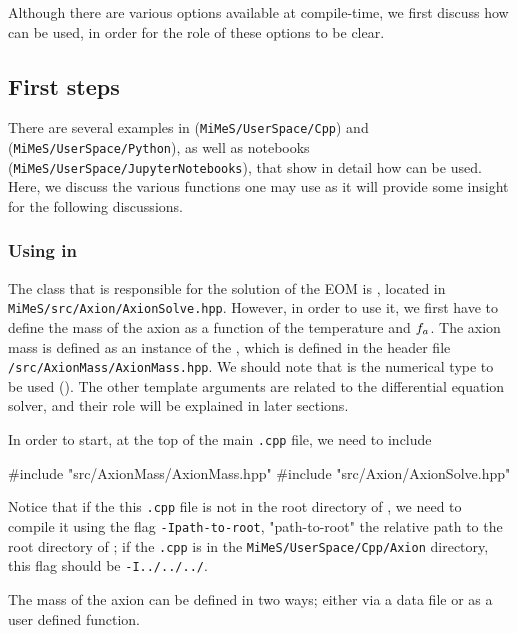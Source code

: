 \documentclass[11pt,a4paper]{article}
\begin{document}
Although there are various options available at compile-time, we first discuss how \mimes can be used, in order for the role of these options to be clear. 


\subsection{First steps}\label{sec:First_examples} 
%
There are several examples in \CPP ({\tt MiMeS/UserSpace/Cpp}) and \PY ({\tt MiMeS/UserSpace/Python}), as well as \JUPY  notebooks ({\tt MiMeS/UserSpace/JupyterNotebooks}), that show in detail how \mimes can be used. Here, we discuss the various functions one may use as it will provide some insight for the following discussions. 

\subsubsection{Using \mimes in \CPP}\label{sec:cpp_first_example}
%
The class that is responsible for the solution of the EOM is , located in {\tt MiMeS/src/Axion/AxionSolve.hpp}. However, in order to use it, we first have to define the mass of the axion as a function of the temperature and $f_{a}{}$. The axion mass is defined as an instance of the , which is defined in the header file {\tt \mimes/src/AxionMass/AxionMass.hpp}. We should note that  is the numerical type to be used (). The other template arguments are related to the differential equation solver, and their role will be explained in later sections. 

In order to start, at the top of the main {\tt .cpp} file, we need to include 
%
\begin{cpp}
	#include "src/AxionMass/AxionMass.hpp"
	#include "src/Axion/AxionSolve.hpp"
\end{cpp}
%
Notice that if the this {\tt .cpp} file is not in the root directory of \mimes, we need to compile it using the flag {\tt -Ipath-to-root}, "path-to-root" the relative path to the root directory of \mimes; \eg if the {\tt .cpp} is in the {\tt MiMeS/UserSpace/Cpp/Axion} directory, this flag should be {\tt -I../../../}.

The mass of the axion can be defined in two ways; either via a data file or as a user defined function. 
\end{document}
